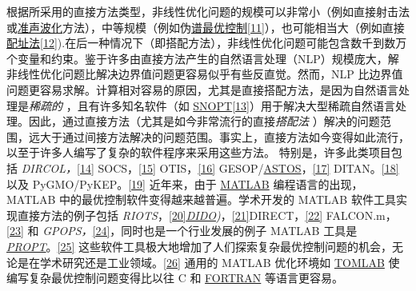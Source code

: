 根据所采用的直接方法类型，非线性优化问题的规模可以非常小（例如直接射击法或\href{https://en.wikipedia.org/wiki/Quasilinearization}{准声波化}方法），中等规模（例如伪\href{https://en.wikipedia.org/wiki/Pseudospectral_optimal_control}{谱最优控制}\href{https://en.wikipedia.org/wiki/Optimal_control#cite_note-ReviewPOC-11}{[11]}），也可能相当大（例如直接\href{https://en.wikipedia.org/wiki/Collocation_method}{配址法}\href{https://en.wikipedia.org/wiki/Optimal_control#cite_note-12}{[12]}).在后一种情况下（即搭配方法），非线性优化问题可能包含数千到数万个变量和约束。鉴于许多由直接方法产生的自然语言处理（NLP）规模庞大，解非线性优化问题比解决边界值问题更容易似乎有些反直觉。然而，NLP 比边界值问题更容易求解。计算相对容易的原因，尤其是直接搭配方法，是因为自然语言处理是\emph{稀疏的} ，且有许多知名软件（如 \href{https://en.wikipedia.org/wiki/SNOPT}{SNOPT}\href{https://en.wikipedia.org/wiki/Optimal_control#cite_note-13}{[13]}）用于解决大型稀疏自然语言处理。因此，通过直接方法（尤其是如今非常流行的直接\emph{搭配法} ）解决的问题范围，远大于通过间接方法解决的问题范围。事实上，直接方法如今变得如此流行，以至于许多人编写了复杂的软件程序来采用这些方法。 特别是，许多此类项目包括 \emph{DIRCOL，}\href{https://en.wikipedia.org/wiki/Optimal_control#cite_note-14}{[14]} SOCS，\href{https://en.wikipedia.org/wiki/Optimal_control#cite_note-15}{[15]} OTIS，\href{https://en.wikipedia.org/wiki/Optimal_control#cite_note-16}{[16]} GESOP/\href{https://en.wikipedia.org/wiki/ASTOS}{ASTOS}，\href{https://en.wikipedia.org/wiki/Optimal_control#cite_note-17}{[17]} DITAN。\href{https://en.wikipedia.org/wiki/Optimal_control#cite_note-18}{[18]} 以及 PyGMO/PyKEP。\href{https://en.wikipedia.org/wiki/Optimal_control#cite_note-19}{[19]} 近年来，由于 \href{https://en.wikipedia.org/wiki/MATLAB}{MATLAB} 编程语言的出现，MATLAB 中的最优控制软件变得越来越普遍。学术开发的 MATLAB 软件工具实现直接方法的例子包括 \emph{RIOTS}，\href{https://en.wikipedia.org/wiki/Optimal_control#cite_note-20}{[20]}\emph{\href{https://en.wikipedia.org/wiki/DIDO_(optimal_control}{DIDO})}，\href{https://en.wikipedia.org/wiki/Optimal_control#cite_note-21}{[21]}DIRECT，\href{https://en.wikipedia.org/wiki/Optimal_control#cite_note-22}{[22]} FALCON.m，\href{https://en.wikipedia.org/wiki/Optimal_control#cite_note-23}{[23]} 和 \emph{GPOPS，}\href{https://en.wikipedia.org/wiki/Optimal_control#cite_note-24}{[24]}，同时也是一个行业发展的例子 MATLAB 工具是 \emph{\href{https://en.wikipedia.org/wiki/PROPT}{PROPT}}。\href{https://en.wikipedia.org/wiki/Optimal_control#cite_note-25}{[25]} 这些软件工具极大地增加了人们探索复杂最优控制问题的机会，无论是在学术研究还是工业领域。\href{https://en.wikipedia.org/wiki/Optimal_control#cite_note-26}{[26]} 通用的 MATLAB 优化环境如 \href{https://en.wikipedia.org/wiki/TOMLAB}{TOMLAB} 使编写复杂最优控制问题变得比以往 C 和 \href{https://en.wikipedia.org/wiki/FORTRAN}{FORTRAN} 等语言更容易。

